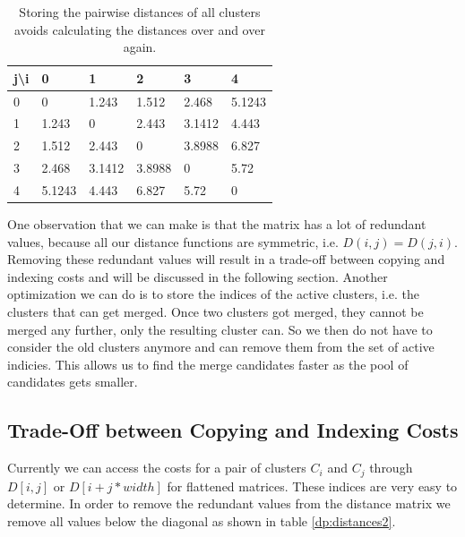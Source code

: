 \begin{table}[H]
    \centering
    \begin{tabular}{|l | l l l l l|}
    \hline
    j\textbackslash i & 0 & 1 & 2 & 3 & 4\\ \hline
    0 & 0 & 1.243 & 1.512 & 2.468 & 5.1243\\
    1 & 1.243 & 0 & 2.443 & 3.1412 & 4.443\\
    2 & 1.512 & 2.443 & 0 & 3.8988 & 6.827\\
    3 & 2.468 & 3.1412 & 3.8988 & 0 & 5.72\\
    4 & 5.1243 & 4.443 & 6.827 & 5.72 & 0\\ \hline
    \end{tabular}
    \caption{Storing the pairwise distances of all clusters avoids calculating the distances over and over again.}
    \label{dp:distances}
\end{table}

One observation that we can make is that the matrix has a lot of redundant values, because all our distance functions are symmetric, i.e. $D(i,j) = D(j,i)$. Removing these redundant values will result in a trade-off between copying and indexing costs and will be discussed in the following section. Another optimization we can do is to store the indices of the active clusters, i.e. the clusters that can get merged. Once two clusters got merged, they cannot be merged any further, only the resulting cluster can. So we then do not have to consider the old clusters anymore and can remove them from the set of active indicies. This allows us to find the merge candidates faster as the pool of candidates gets smaller.

\subsection{Trade-Off between Copying and Indexing Costs}

Currently we can access the costs for a pair of clusters $C_i$ and $C_j$ through $D[i,j]$ or $D[i + j * width]$ for flattened matrices. These indices are very easy to determine. In order to remove the redundant values from the distance matrix we remove all values below the diagonal as shown in table \ref{dp:distances2}.

